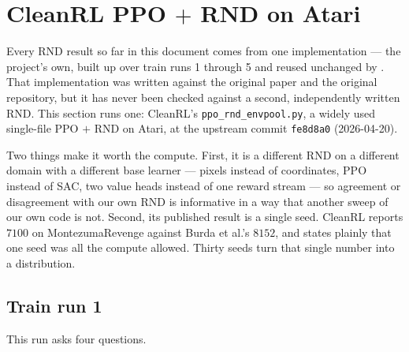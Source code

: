 \clearpage
\section{CleanRL PPO \texorpdfstring{$+$}{+} RND on Atari}
\label{sec:cleanrl}

Every RND result so far in this document comes from one implementation --- the project's own, built
up over train runs 1 through 5 and reused unchanged by . That implementation was
written against the original paper and the original repository, but it has never been checked against
a second, independently written RND. This section runs one: CleanRL's
\texttt{ppo\_\allowbreak rnd\_\allowbreak envpool.py}, a widely used single-file PPO $+$ RND on
Atari, at the upstream commit \texttt{fe8d8a0} (2026-04-20).

Two things make it worth the compute. First, it is a different RND on a different domain with a
different base learner --- pixels instead of coordinates, PPO instead of SAC, two value heads instead
of one reward stream --- so agreement or disagreement with our own RND is informative in a way that
another sweep of our own code is not. Second, its published result is a single seed. CleanRL reports
$7100$ on MontezumaRevenge against Burda et al.'s $8152$, and states plainly that one seed was all
the compute allowed. Thirty seeds turn that single number into a distribution.

\subsection{Train run 1}
\label{sec:cleanrl-trainrun1}

This run asks four questions.

